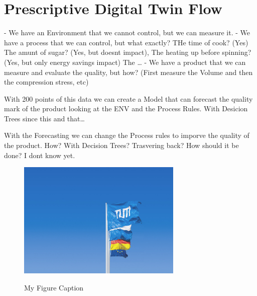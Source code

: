\section{Prescriptive Digital Twin Flow}

- We have an Environment that we cannot control, but we can measure it.
- We have a process that we can control, but what exactly? THe time of cook? (Yes) The amunt of sugar? (Yes, but doesnt impact), The heating up before spinning? (Yes, but only energy savings impact) The \dots
- We have a product that we can measure and evaluate the quality, but how? (First measure the Volume and then the compression stress, etc) 

With 200 points of this data we can create a Model that can forecast the quality mark of the product looking at the ENV and the Process Rules. With Desicion Trees since this and that\dots

With the Forecasting we can change the Process rules to imporve the quality of the product. How? With Decision Trees? Trasvering back? How should it be done? I dont know yet.


\begin{figure}[h]
    \centering
    \caption{My Figure Caption}
    \includegraphics[width=0.7\textwidth]{tum-resources/images/Universitaet_Flaggen.jpg}
    \label{fig:firstFigure}
\end{figure}
